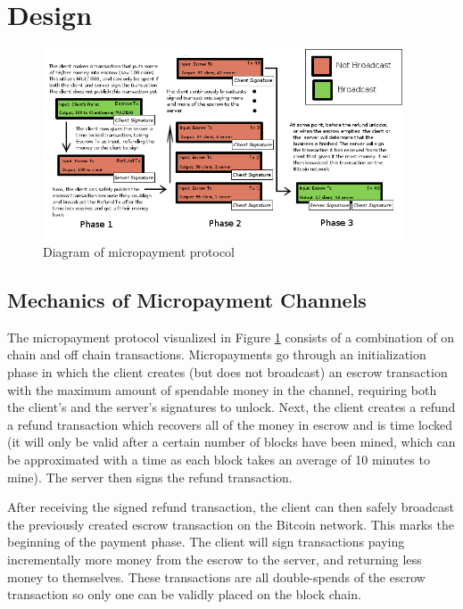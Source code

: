 \section{Design}
\label{sec:design}

\begin{figure}
  \centering
  \includegraphics[width=0.95\textwidth]{microtransactions.png}
  \caption{Diagram of micropayment protocol}
  \label{fig:micropayment-protocol}
\end{figure}

\subsection{Mechanics of Micropayment Channels}

The micropayment protocol visualized in Figure \ref{fig:micropayment-protocol} consists of a combination of on chain and off chain transactions. Micropayments go through an initialization phase in which the client creates (but does not broadcast) an escrow transaction with the maximum amount of spendable money in the channel, requiring both the client's and the server's signatures to unlock. Next, the client creates a refund a refund transaction which recovers all of the money in escrow and is time locked (it will only be valid after a certain number of blocks have been mined, which can be approximated with a time as each block takes an average of 10 minutes to mine). The server then signs the refund transaction.

After receiving the signed refund transaction, the client can then safely broadcast the previously created escrow transaction on the Bitcoin network. This marks the beginning of the payment phase. The client will sign transactions paying incrementally more money from the escrow to the server, and returning less money to themselves. These transactions are all double-spends of the escrow transaction so only one can be validly placed on the block chain.

